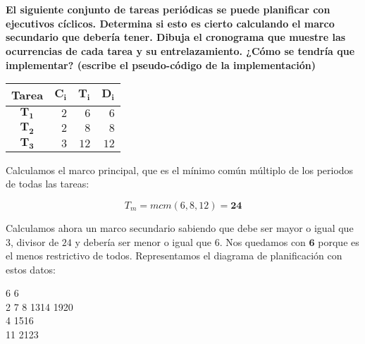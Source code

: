 \pagebreak

\section{}

\textbf{El siguiente conjunto de tareas periódicas se puede planificar con ejecutivos cíclicos.
Determina si esto es cierto calculando el marco secundario que debería tener.
Dibuja el cronograma que muestre las ocurrencias de cada tarea y su entrelazamiento.
¿Cómo se tendría que implementar? (escribe el pseudo-código de la implementación)}

\begin{center}
	\begin{tabular}{|c|rrr|}
		\hline
		\textbf{Tarea} & $\boldsymbol{C_i}$ & $\boldsymbol{T_i}$ & $\boldsymbol{D_i}$ \\
		\hline
		\hline
		$\boldsymbol{T_1}$ & $2$ & $6$  & $6$  \\
		$\boldsymbol{T_2}$ & $2$ & $8$  & $8$  \\
		$\boldsymbol{T_3}$ & $3$ & $12$ & $12$ \\
		\hline
	\end{tabular}
\end{center}

Calculamos el marco principal, que es el mínimo común múltiplo de los periodos de todas las tareas:

\[T_m=mcm(6,8,12)=\boldsymbol{24}\]

Calculamos ahora un marco secundario sabiendo que debe ser mayor o igual que $3$, divisor de $24$ y debería ser menor o igual que $6$.
Nos quedamos con $\boldsymbol{6}$ porque es el menos restrictivo de todos.
Representamos el diagrama de planificación con estos datos:

\begin{center}
	\begin{ganttchart}[x unit=3mm, hgrid=true, vgrid={{dotted}}]{1}{24}
		 {6}
		 {6}
		 \\

		 {2}
		\ganttbar{}     {7} {8}
		\ganttbar{}     {13}{14}
		\ganttbar{}     {19}{20} \\
		 {4}
		\ganttbar{}     {15}{16} \\
		 {11}
		\ganttbar{}     {21}{23}
	\end{ganttchart}
\end{center}

